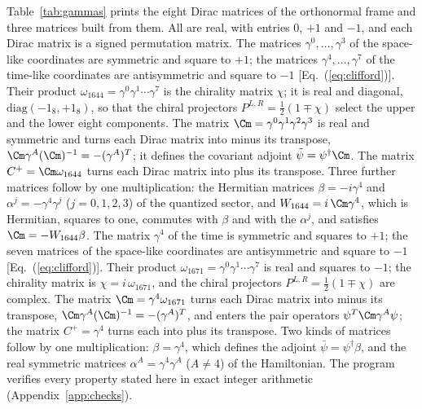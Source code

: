 Table~\ref{tab:gammas} prints the eight Dirac matrices of the orthonormal frame and three matrices
built from them. All are real, with entries $0$, $+1$ and $-1$, and each Dirac matrix is a signed
permutation matrix.
The matrices $\gamma^{0},\dots,\gamma^{3}$ of the space-like coordinates are symmetric and square
to $+1$; the matrices $\gamma^{4},\dots,\gamma^{7}$ of the time-like coordinates are antisymmetric
and square to $-1$ [Eq.~(\ref{eq:clifford})]. Their product
$\omega_{1644}=\gamma^{0}\gamma^{1}\cdots\gamma^{7}$ is the chirality matrix $\chi$; it is real and
diagonal, $\mathrm{diag}(-1_8,+1_8)$, so that the chiral projectors $P^{L,R}=\tfrac12(1\mp\chi)$
select the upper and the lower eight components. The matrix $\Cm=\gamma^{0}\gamma^{1}\gamma^{2}\gamma^{3}$
is real and symmetric and turns each Dirac matrix into minus its transpose,
$\Cm\gamma^{A}(\Cm)^{-1}=-(\gamma^{A})^{T}$; it defines the covariant adjoint
$\tilde\psi=\psi^\dagger\Cm$. The matrix $C^{+}=\Cm\omega_{1644}$ turns each Dirac matrix into plus
its transpose. Three further matrices follow by one multiplication: the Hermitian matrices
$\beta=-i\gamma^{4}$ and $\alpha^{j}=-\gamma^{4}\gamma^{j}$ ($j=0,1,2,3$) of the quantized sector,
and $W_{1644}=i\,\Cm\gamma^{4}$, which is Hermitian, squares to one, commutes with $\beta$ and with
the $\alpha^{j}$, and satisfies $\Cm=-W_{1644}\beta$.
The matrix $\gamma^{4}$ of the time is symmetric and squares to $+1$; the seven matrices of the
space-like coordinates are antisymmetric and square to $-1$ [Eq.~(\ref{eq:clifford})]. Their
product $\omega_{1671}=\gamma^{0}\gamma^{1}\cdots\gamma^{7}$ is real and squares to $-1$; the
chirality matrix is $\chi=i\,\omega_{1671}$, and the chiral projectors $P^{L,R}=\tfrac12(1\mp\chi)$
are complex. The matrix $\Cm=\gamma^{4}\omega_{1671}$ turns each Dirac matrix into minus its
transpose, $\Cm\gamma^{A}(\Cm)^{-1}=-(\gamma^{A})^{T}$, and enters the pair operators
$\psi^{T}\Cm\gamma^{A}\psi$; the matrix $C^{+}=\gamma^{4}$ turns each into plus its transpose. Two
kinds of matrices follow by one multiplication: $\beta=\gamma^{4}$, which defines the adjoint
$\bar\psi=\psi^\dagger\beta$, and the real symmetric matrices $\alpha^{A}=\gamma^{4}\gamma^{A}$
($A\ne4$) of the Hamiltonian.
The program verifies every property stated here in exact integer arithmetic
(Appendix~\ref{app:checks}).


